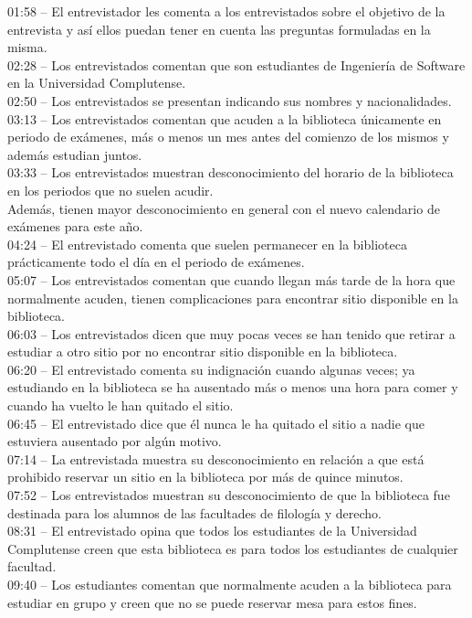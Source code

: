 \documentclass[12pt]{article}
\begin{document}
01:58 – El entrevistador les comenta a los entrevistados sobre el objetivo de la entrevista y así ellos puedan tener en cuenta las preguntas formuladas en la misma.\\
02:28 – Los entrevistados comentan que son estudiantes de Ingeniería de Software en la Universidad Complutense.\\
02:50 – Los entrevistados se presentan indicando sus nombres y nacionalidades.\\
03:13 – Los entrevistados comentan que acuden a la biblioteca únicamente en periodo de exámenes, más o menos un mes antes del comienzo de los mismos y además estudian juntos.\\
03:33 – Los entrevistados muestran desconocimiento del horario de la biblioteca en los periodos que no suelen acudir.\\ Además, tienen mayor desconocimiento en general con el nuevo calendario de exámenes para este año.\\
04:24 – El entrevistado comenta que suelen permanecer en la biblioteca prácticamente todo el día en el periodo de exámenes.\\
05:07 – Los entrevistados comentan que cuando llegan más tarde de la hora que normalmente acuden, tienen complicaciones para encontrar sitio disponible en la biblioteca.\\
06:03 – Los entrevistados dicen que muy pocas veces se han tenido que retirar a estudiar a otro sitio por no encontrar sitio disponible en la biblioteca.\\
06:20 – El entrevistado comenta su indignación cuando algunas veces; ya estudiando en la biblioteca se ha ausentado más o menos una hora para comer y cuando ha vuelto le han quitado el sitio.\\
06:45 – El entrevistado dice que él nunca le ha quitado el sitio a nadie que estuviera ausentado por algún motivo.\\
07:14 – La entrevistada muestra su desconocimiento en relación a que está prohibido reservar un sitio en la biblioteca por más de quince minutos.\\
07:52 – Los entrevistados muestran su desconocimiento de que la biblioteca fue destinada para los alumnos de las facultades de filología y derecho.\\
08:31 – El entrevistado opina que todos los estudiantes de la Universidad Complutense creen que esta biblioteca es para todos los estudiantes de cualquier facultad.\\ 
09:40 – Los estudiantes comentan que normalmente acuden a la biblioteca para estudiar en grupo y creen que no se puede reservar mesa para estos fines.\\
\end{document}
